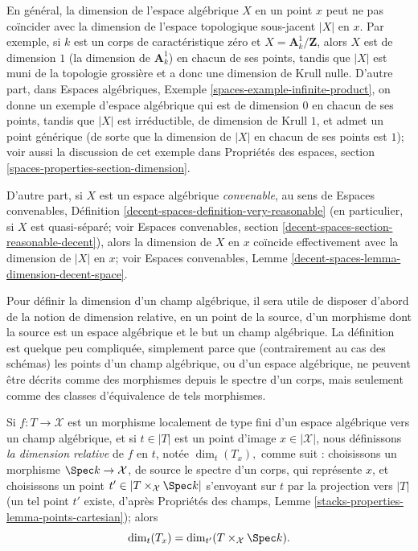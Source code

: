 \begin{remark}
\label{remark-dimension-algebraic-space}
En général, la dimension de l'espace algébrique $X$ en un point $x$
peut ne pas coïncider avec la dimension de l'espace topologique sous-jacent
$|X|$ en $x$. Par exemple, si $k$ est un corps de caractéristique zéro et
$X =  \mathbf{A}^1_k / \mathbf{Z}$, alors $X$ est de dimension $1$ (la dimension
de $\mathbf{A}^1_k$) en chacun de ses points,
tandis que $|X|$ est muni de la topologie grossière et a donc une
dimension de Krull nulle. D'autre part, dans
Espaces algébriques, Exemple \ref{spaces-example-infinite-product},
on donne un exemple d'espace algébrique
qui est de dimension $0$ en chacun de ses points, tandis que $|X|$ est
irréductible, de dimension de Krull $1$, et admet un point générique (de sorte que la
dimension de $|X|$ en chacun de ses points est $1$); voir aussi la discussion
de cet exemple dans
Propriétés des espaces, section \ref{spaces-properties-section-dimension}.

\medskip\noindent
D'autre part, si $X$ est un espace algébrique {\it convenable}, au sens de
Espaces convenables, Définition \ref{decent-spaces-definition-very-reasonable}
(en particulier, si $X$ est quasi-séparé; voir
Espaces convenables, section \ref{decent-spaces-section-reasonable-decent}),
alors la dimension de $X$ en $x$ coïncide effectivement avec la dimension
de $|X|$ en $x$; voir
Espaces convenables, Lemme \ref{decent-spaces-lemma-dimension-decent-space}.
\end{remark}

\noindent
Pour définir la dimension d'un champ algébrique,
il sera utile de disposer d'abord de la notion de dimension relative,
en un point de la source,
d'un morphisme dont la source est un espace algébrique
et le but un champ algébrique. La définition est quelque peu
compliquée, simplement parce que (contrairement au cas des schémas) les points d'un
champ algébrique, ou d'un espace
algébrique, ne peuvent être décrits comme des morphismes depuis le spectre d'un corps,
mais seulement comme des classes d'équivalence de tels morphismes.

\begin{definition}
\label{definition-relative-dimension}
Si $f : T \to \mathcal{X}$ est un morphisme localement de type fini d'un
espace algébrique vers un champ algébrique,
et si $t \in |T|$ est un point d'image $x \in | \mathcal{X}|$, nous définissons
{\it la dimension relative} de $f$ en $t$, notée
$\dim_t(T_x),$
comme suit :
choisissons un morphisme $\Spec k \to \mathcal{X}$, de source le spectre d'un
corps, qui représente $x$, et choisissons un point
$t' \in |T \times_{\mathcal{X}} \Spec k|$
s'envoyant sur $t$ par la projection vers $|T|$
(un tel point $t'$ existe, d'après
Propriétés des champs, Lemme \ref{stacks-properties-lemma-points-cartesian});
alors
$$
\dim_t(T_x) = \dim_{t'}(T \times_{\mathcal{X}} \Spec k ).
$$
\end{definition}

